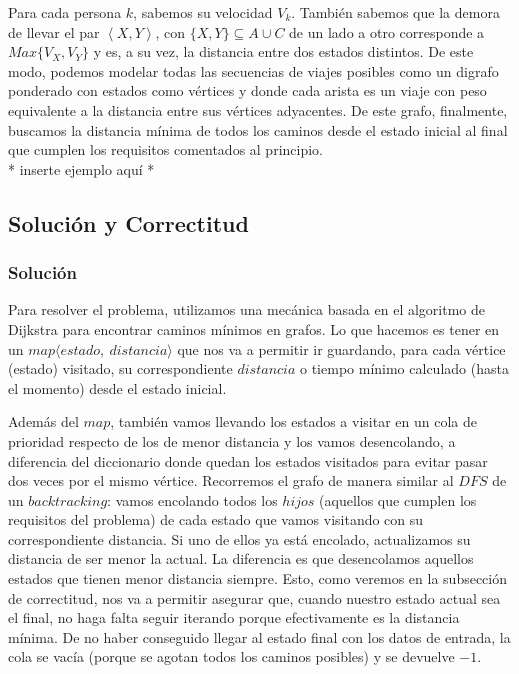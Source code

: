 		Para cada persona $k$, sabemos su velocidad $V_k$. También sabemos que la demora de llevar el par $\left \langle {X, Y} \right \rangle$, con $\{X,Y\} \subseteq A \cup C$ de un lado a otro corresponde a $Max\{ V_{X}, V_{Y}  \}$ y es, a su vez, la distancia entre dos estados distintos. De este modo, podemos modelar todas las secuencias de viajes posibles como un digrafo ponderado con estados como vértices y donde cada arista es un viaje con peso equivalente a la distancia entre sus vértices adyacentes. De este grafo, finalmente, buscamos la distancia mínima de todos los caminos desde el estado inicial al final que cumplen los requisitos comentados al principio.
		\\

		* inserte ejemplo aquí *

\subsection{Solución y Correctitud}
	\subsubsection{Solución}

	Para resolver el problema, utilizamos una mecánica basada en el algoritmo de Dijkstra para encontrar caminos mínimos en grafos. Lo que hacemos es tener en un $map\langle {estado,\ distancia} \rangle$ que nos va a permitir ir guardando, para cada vértice (estado) visitado, su correspondiente $distancia$ o tiempo mínimo calculado (hasta el momento) desde el estado inicial.

		Además del $map$, también vamos llevando los estados a visitar en un cola de prioridad respecto de los de menor distancia y los vamos desencolando, a diferencia del diccionario donde quedan los estados visitados para evitar pasar dos veces por el mismo vértice.
		Recorremos el grafo de manera similar al $DFS$ de un $backtracking$: vamos encolando todos los $hijos$ (aquellos que cumplen los requisitos del problema) de cada estado que vamos visitando con su correspondiente distancia. Si uno de ellos ya está encolado, actualizamos su distancia de ser menor la actual. La diferencia es que desencolamos aquellos estados que tienen menor distancia siempre. Esto, como veremos en la subsección de correctitud, nos va a permitir asegurar que, cuando nuestro estado actual sea el final, no haga falta seguir iterando porque efectivamente es la distancia mínima.
		De no haber conseguido llegar al estado final con los datos de entrada, la cola se vacía (porque se agotan todos los caminos posibles) y se devuelve $-1$.


